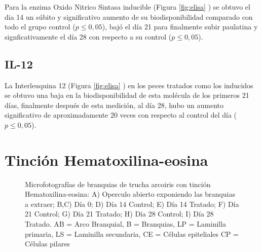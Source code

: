 \documentclass[12pt,letterpaper,oneside]{scrbook}
\begin{document}
Para la enzima Oxido Nitrico Sintasa inducible (Figura \ref{fig:elisa}
) se obtuvo el dia 14 un súbito y significativo
aumento de su biodisponibilidad comparado con todo el grupo control
(\(p \leq 0,05\)), bajó el día 21 para finalmente subir paulatina y
signficativamente el día 28 con respecto a su control (\(p \leq 0,05\)).

\subsection{IL-12}

La Interleuquina 12 (Figura \ref{fig:elisa} ) en
los peces tratados como los inducidos se obtuvo una baja en la
biodisponibilidad de esta molécula de los primeros 21 días, finalmente
después de esta medición, al día 28, hubo un aumento significativo de
aproximadamente 20 veces con respecto al control del día
(\(p \leq 0,05\)).

\clearpage

\section{Tinción Hematoxilina-eosina}

\begin{figure}[h!]
    \centering
    \caption[Microfotografías de branquias de trucha arcoiris]{Microfotografías de branquias de trucha arcoiris con tinción Hematoxilina-eosina: A) Operculo abierto exponiendo las branquias a extraer; B,C) Día 0; D) Día 14 Control; E) Día 14 Tratado; F) Día 21 Control; G) Día 21 Tratado; H) Día 28 Control; I) Día 28 Tratado. AB = Arco Branquial, B = Branquias, LP = Laminilla primaria, LS = Laminilla secundaria, CE = Células epiteliales CP = Células pilares}
    \label {fig:gills}
\end{figure}
\end{document}
